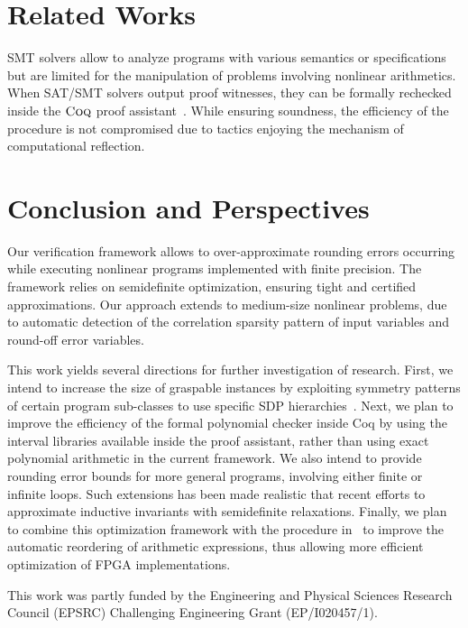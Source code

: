 \documentclass[preprint]{sigplanconf}
\newcommand{\coq}{\text{\sc Coq}}
\theoremstyle{plain}
\begin{document}
\section{Related Works}
%
SMT solvers allow to analyze programs with various semantics or specifications but are limited for the manipulation of problems involving nonlinear arithmetics. When SAT/SMT solvers output proof witnesses, they can be formally rechecked inside the $\coq$ proof assistant~\cite{smtcoq}. While ensuring soundness, the efficiency of the procedure is not compromised due to tactics enjoying the mechanism of computational reflection.

\section{Conclusion and Perspectives} %
%
Our verification framework allows to over-approximate rounding errors occurring while executing nonlinear programs implemented with finite precision.
The framework relies on semidefinite optimization, ensuring tight and certified approximations. Our approach extends to medium-size nonlinear problems, due to  automatic detection of the correlation sparsity pattern of input variables and round-off error variables.

This work yields several directions for further investigation of research. 
First, we intend to increase the size of graspable instances by exploiting symmetry patterns of certain program sub-classes to use specific SDP hierarchies~\cite{Riener2013SymmetricSDP}. Next, we plan to improve the efficiency of the formal polynomial checker inside Coq by using the interval libraries available inside the proof assistant, rather than using exact polynomial arithmetic in the current framework. 
We also intend to provide rounding error bounds for more general programs, involving either finite or infinite loops. Such extensions has been made realistic that recent efforts to approximate inductive invariants with semidefinite relaxations.
Finally, we plan to combine this optimization framework with the procedure in~\cite{Gao15FPGA} to improve the automatic reordering of arithmetic expressions, thus allowing more efficient optimization of FPGA implementations.



\acks
This work was partly funded by the Engineering and Physical Sciences Research Council (EPSRC) Challenging Engineering Grant (EP/I020457/1).


\end{document}
